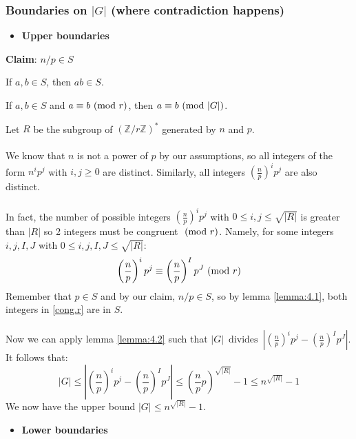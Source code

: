 \subsubsection{Boundaries on $|G|$ (where contradiction happens)}
\begin{itemize}
    \item \textbf{Upper boundaries}
\end{itemize}
\textbf{Claim}: $n/p \in S$
\begin{lemma} \label{lemma:4.1}
If $a, b \in S$, then $ab \in S$.
\end{lemma}
\begin{lemma} \label{lemma:4.2}
If $a, b \in S$ and $a \equiv b \ (\mathrm{mod}\ r)$, then $a \equiv b \ (\mathrm{mod}\ |G|)$.
\end{lemma}

Let $R$ be the subgroup of $(\mathbb{Z}/r\mathbb{Z})^*$ generated by $n$ and $p$.\\\\
We know that $n$ is not a power of $p$ by our assumptions, so all integers of the form $n^ip^j$ with $i,j\geq 0$ are distinct. Similarly, all integers $(\frac{n}{p})^ip^j$ are also distinct.\\\\
In fact, the number of possible integers $(\frac{n}{p})^ip^j$ with $0\leq i,j\leq \sqrt{|R|}$ is greater than $|R|$ so 2 integers must be congruent $\ (\mathrm{mod}\ r)$. Namely, for some integers $i,j,I,J$ with $0\leq i,j,I,J \leq \sqrt{|R|}$:
\begin{equation}
\label{cong.r}
    \left(\frac{n}{p}\right)^ip^j\equiv \left(\frac{n}{p}\right)^Ip^J\ (\mathrm{mod}\ r)
\end{equation}
Remember that $p\in S$ and by our claim, $n/p\in S$, so by lemma \ref{lemma:4.1}, both integers in \ref{cong.r} are in $S$.\\\\
Now we can apply lemma \ref{lemma:4.2} such that $|G|\,\,\,\text{divides}\,\,\,\left|\left(\frac{n}{p}\right)^ip^j-\left(\frac{n}{p}\right)^Ip^J\right|$. It follows that:
\begin{equation*}
    |G|\leq 
    \left|\left(\frac{n}{p}\right)^ip^j-\left(\frac{n}{p}\right)^Ip^J\right|\leq
    \left(\frac{n}{p}p\right)^{\sqrt{|R|}}-1\leq
    n^{\sqrt{|R|}}-1
\end{equation*}
We now have the upper bound $|G|\leq n^{\sqrt{|R|}}-1$.
\begin{itemize}
    \item \textbf{Lower boundaries}
\end{itemize}
